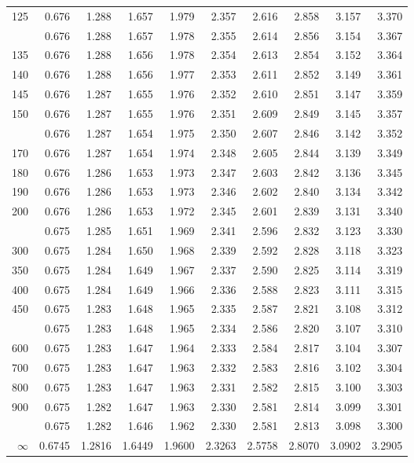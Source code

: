 \documentclass[10pt]{article}
\begin{document}
\begin{center}
\begin{longtable}{@{}r!{\vrule width 0.8pt\hspace{0.65em}}rrrrrrrrr@{}}
125 & 0.676 & 1.288 & 1.657 & 1.979 & 2.357 & 2.616 & 2.858 & 3.157 & 3.370 \\
 & 0.676 & 1.288 & 1.657 & 1.978 & 2.355 & 2.614 & 2.856 & 3.154 & 3.367 \\
135 & 0.676 & 1.288 & 1.656 & 1.978 & 2.354 & 2.613 & 2.854 & 3.152 & 3.364 \\
140 & 0.676 & 1.288 & 1.656 & 1.977 & 2.353 & 2.611 & 2.852 & 3.149 & 3.361 \\
145 & 0.676 & 1.287 & 1.655 & 1.976 & 2.352 & 2.610 & 2.851 & 3.147 & 3.359 \\
150 & 0.676 & 1.287 & 1.655 & 1.976 & 2.351 & 2.609 & 2.849 & 3.145 & 3.357 \\
 & 0.676 & 1.287 & 1.654 & 1.975 & 2.350 & 2.607 & 2.846 & 3.142 & 3.352 \\
170 & 0.676 & 1.287 & 1.654 & 1.974 & 2.348 & 2.605 & 2.844 & 3.139 & 3.349 \\
180 & 0.676 & 1.286 & 1.653 & 1.973 & 2.347 & 2.603 & 2.842 & 3.136 & 3.345 \\
190 & 0.676 & 1.286 & 1.653 & 1.973 & 2.346 & 2.602 & 2.840 & 3.134 & 3.342 \\
200 & 0.676 & 1.286 & 1.653 & 1.972 & 2.345 & 2.601 & 2.839 & 3.131 & 3.340 \\
 & 0.675 & 1.285 & 1.651 & 1.969 & 2.341 & 2.596 & 2.832 & 3.123 & 3.330 \\
300 & 0.675 & 1.284 & 1.650 & 1.968 & 2.339 & 2.592 & 2.828 & 3.118 & 3.323 \\
350 & 0.675 & 1.284 & 1.649 & 1.967 & 2.337 & 2.590 & 2.825 & 3.114 & 3.319 \\
400 & 0.675 & 1.284 & 1.649 & 1.966 & 2.336 & 2.588 & 2.823 & 3.111 & 3.315 \\
450 & 0.675 & 1.283 & 1.648 & 1.965 & 2.335 & 2.587 & 2.821 & 3.108 & 3.312 \\
 & 0.675 & 1.283 & 1.648 & 1.965 & 2.334 & 2.586 & 2.820 & 3.107 & 3.310 \\
600 & 0.675 & 1.283 & 1.647 & 1.964 & 2.333 & 2.584 & 2.817 & 3.104 & 3.307 \\
700 & 0.675 & 1.283 & 1.647 & 1.963 & 2.332 & 2.583 & 2.816 & 3.102 & 3.304 \\
800 & 0.675 & 1.283 & 1.647 & 1.963 & 2.331 & 2.582 & 2.815 & 3.100 & 3.303 \\
900 & 0.675 & 1.282 & 1.647 & 1.963 & 2.330 & 2.581 & 2.814 & 3.099 & 3.301 \\
 & 0.675 & 1.282 & 1.646 & 1.962 & 2.330 & 2.581 & 2.813 & 3.098 & 3.300 \\
$\infty$ & 0.6745 & 1.2816 & 1.6449 & 1.9600 & 2.3263 & 2.5758 & 2.8070 & 3.0902 & 3.2905 \\
\end{longtable}
\end{center}
\end{document}
